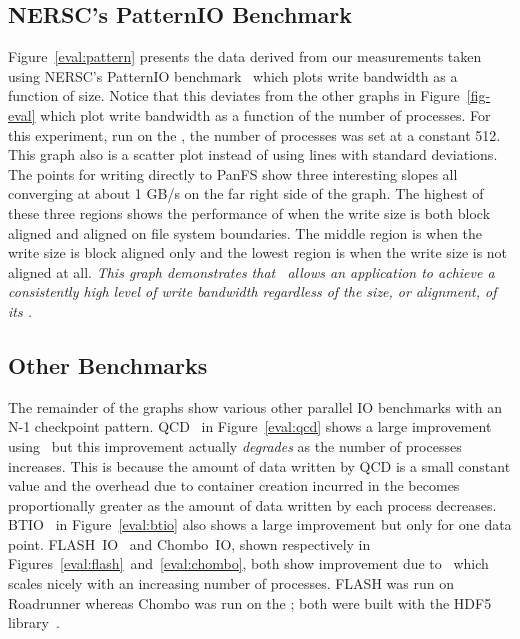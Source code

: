 \subsection{NERSC's PatternIO Benchmark}

Figure~\ref{eval:pattern} presents the data derived from our measurements taken
using NERSC's PatternIO benchmark~\cite{nersc} which plots write bandwidth as a
function of  size. Notice that this deviates from the other
graphs in Figure~\ref{fig-eval} which plot write bandwidth as a function of the
number of processes. For this experiment, run on the \rrz, the number of
processes was set at a constant 512. This graph also is a scatter plot instead
of using lines with standard deviations. The points for writing directly to
PanFS show three interesting slopes all converging at about 1 GB/s on the far
right side of the graph. The highest of these three regions shows the
performance of  when the write size is both block aligned and
aligned on file system boundaries. The middle region is when the write size is
block aligned only and the lowest region is when the write size is not aligned
at all. {\em This graph demonstrates that \plfs\ allows an application to
achieve a consistently high level of write bandwidth regardless of the size, or
alignment, of its .}

\subsection{Other Benchmarks}

The remainder of the graphs show various other parallel IO benchmarks with an
N-1 checkpoint pattern. QCD~\cite{qcd-io} in Figure~\ref{eval:qcd} shows a
large improvement using \plfs\ but this improvement actually {\em degrades} as
the number of processes increases. This is because the amount of data written
by QCD is a small constant value and the overhead due to container creation
incurred in the  becomes proportionally greater as the amount of
data written by each process decreases. BTIO~\cite{btio-io} in
Figure~\ref{eval:btio} also shows a large improvement but only
for one data point.
FLASH~IO~\cite{flash-io} and Chombo~IO\cite{chombo-io}, shown respectively in
Figures~\ref{eval:flash}~and~\ref{eval:chombo}, both show improvement due to
\plfs\ which scales nicely with an increasing number of processes. FLASH was
run on Roadrunner whereas Chombo was run on the \rrz; both were built with the
HDF5 library~\cite{hdf5}.

